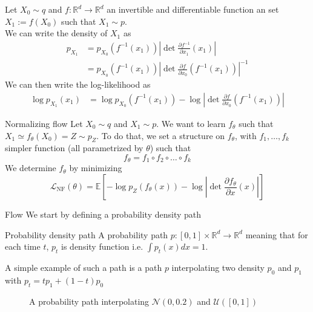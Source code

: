 \documentclass{beamer}
\begin{document}
\begin{frame}
    Let \(X_0\sim q\) and \(f:\mathbb{R}^d\rightarrow\mathbb{R}^d\) an invertible and differentiable function an set  \(X_1:=f(X_0)\) such that \(X_1\sim p\).\\
    We can write the density of \(X_1\) as
    \begin{align}
        p_{X_1} &= p_{X_0}(f^{-1}(x_1))\left| \det \frac{\partial f^{-1}}{\partial x_1}(x_1)\right|\\
        &= p_{X_0}(f^{-1}(x_1))\left| \det \frac{\partial f}{\partial x_0}(f^{-1}(x_1))\right|^{-1} 
    \end{align}
    We can then write the log-likelihood as
    \begin{align}
        \log p_{X_1}(x_1) &= \log p_{X_0}(f^{-1}(x_1))-\log \left| \det \frac{\partial f}{\partial x_0}(f^{-1}(x_1))\right|
    \end{align}
\end{frame}

\begin{frame}{Normalizing flow}
    Let \(X_0\sim q\) and \(X_1\sim p\). We want to learn \(f_\theta\) such that \(X_1 \simeq f_\theta(X_0)=Z\sim p_Z\). To do that, we set a structure on \(f_\theta\), with \(f_1,\ldots,f_k\) simpler function (all parametrized by \(\theta\)) such that 
    \[f_\theta=f_1\circ f_2\circ\ldots\circ f_k\] 
    We determine \(f_\theta\) by minimizing 
    \[\mathcal{L}_\text{NF}(\theta)= \mathbb{E}\left[-\log p_Z(f_\theta(x))-\log \left|\det \frac{\partial f_\theta}{\partial x}(x)\right|\right]\]
\end{frame}

\begin{frame}{Flow}
    We start by defining a probability density path
    \begin{block}{Probability density path}
        A probability path \(p:[0,1]\times\mathbb{R}^d\rightarrow\mathbb{R}^d\) meaning that for each time \(t\), \(p_t\) is density function i.e. \(\int p_t(x)dx=1\).\\
    \end{block}
    A simple example of such a path is a path \(p\) interpolating two density \(p_0\) and \(p_1\) with \(p_t=tp_1+(1-t)p_0\)
    \begin{figure}[htbp]
        \centering
        \caption{A probability path interpolating $\mathcal{N}(0,0.2)$ and $\mathcal{U}([0,1])$}
    \end{figure}
\end{frame}
\end{document}
